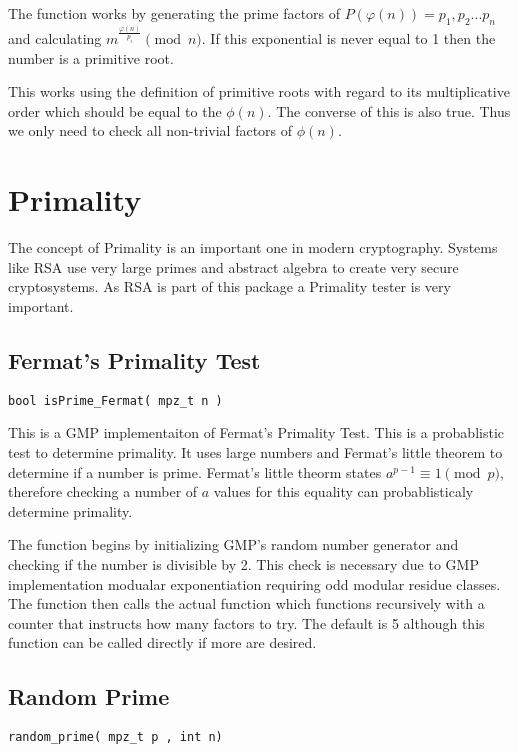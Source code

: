 The function works by generating the prime factors of $P(\varphi(n)) = p_1,p_2 ... p_n $ and calculating $m^{\frac{\varphi(n)}{p_i}} \pmod n$.
If this exponential is never equal to 1 then the number is a primitive root.

This works using the definition of primitive roots with regard to its multiplicative order which should be equal to the $\phi(n)$. 
The converse of this is also true. Thus we only need to check all non-trivial factors of $\phi(n)$.

\section{Primality}

The concept of Primality is an important one in modern cryptography.
Systems like RSA use very large primes and abstract algebra to create very secure cryptosystems.
As RSA is part of this package a Primality tester is very important.

\subsection{Fermat's Primality Test}
\begin{verbatim}
bool isPrime_Fermat( mpz_t n )
\end{verbatim}

This is a GMP implementaiton of Fermat's Primality Test.
This is a probablistic test to determine primality.
It uses large numbers and Fermat's little theorem to determine if a number is prime.
Fermat's little theorm states $a^{p-1} \equiv 1 \pmod p$, therefore checking a number of $a$ values for this equality can probablisticaly determine primality.

The function begins by initializing GMP's random number generator and checking if the number is divisible by 2.
This check is necessary due to GMP implementation modualar exponentiation requiring odd modular residue classes.
The function then calls the actual function which functions recursively with a counter that instructs how many factors to try.
The default is 5 although this function can be called directly if more are desired.


\subsection{Random Prime}
\begin{verbatim}
random_prime( mpz_t p , int n)
\end{verbatim}

